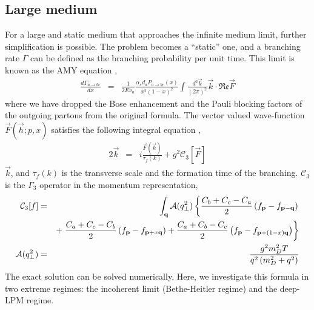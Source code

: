 \subsection{Large medium}
For a large and static medium that approaches the infinite medium limit, 
further simplification is possible. 
The problem becomes a ``static'' one, and a branching rate $\Gamma$ can be defined as the branching probability per unit time.
This limit is known as the AMY equation \cite{Arnold:2002ja,Arnold:2002zm,Arnold:2003zc},
\begin{eqnarray}\label{eq:AMY-1}
\nonumber
\frac{d\Gamma_{a\rightarrow bc}}{dx} &=& \frac{1}{2E\nu_a} \frac{\alpha_s d_a P_{a\rightarrow bc}(x)}{x^2(1-x)^2}\int\frac{d^2\vec{k}}{(2\pi)^2}\vec{k}\cdot \mathfrak{Re} \vec{F}
\end{eqnarray}
where we have dropped the Bose enhancement and the Pauli blocking factors of the outgoing partons from the original formula.
The vector valued wave-function $\vec{F}(\vec{h}; p, x)$ satisfies the following integral equation \cite{Arnold:2002ja},
\begin{eqnarray}\label{eq:AMY-2}
\nonumber
2\vec{k} &=& i\frac{\vec{F}(\vec{k})}{\tau_f(k)}  + g^2 \mathcal{C}_3[\vec{F}]
\end{eqnarray} 
$\vec{k}$, and $\tau_f(k)$ is the transverse scale and the formation time of the branching. $\mathcal{C}_3$ is the $\Gamma_3$ operator in the momentum representation,
\begin{eqnarray}
\mathcal{C}_3[f] &=& \int_{\bf q} \mathcal{A}(q_\perp^2)
\left\{  \frac{C_b+C_c-C_a}{2}\left(f_{\bf p}-f_{{\bf p}-{\bf q}}\right) \right.\\\nonumber
&& + \left. \frac{C_a+C_c-C_b}{2}\left(f_{\bf p}-f_{{\bf p}+x{\bf q}}\right) + \frac{C_a+C_b-C_c}{2}\left(f_{\bf p}-f_{{\bf p}+(1-x){\bf q}}\right)\right\}\\
\mathcal{A}(q_\perp^2) &=& \frac{g^2 m_D^2 T}{q^2\left(m_D^2+q^2\right)}
\end{eqnarray}
The exact solution can be solved numerically.
Here, we investigate this formula in two extreme regimes: the incoherent limit (Bethe-Heitler regime) and the deep-LPM regime.

